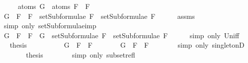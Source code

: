 \begin{isabellebody}
\ \ \ \ \ {\isachardoublequoteopen}atoms\ G\ {\isasymsubseteq}\ atoms\ {\isacharparenleft}F{}\ \isactrlbold {\isasymrightarrow}\ F{}{\isacharparenright}{\isachardoublequoteclose}\isanewline
%
\isadelimproof
%
\endisadelimproof
%
\isatagproof
{}\isamarkupfalse%
\ {\isacharminus}\isanewline
\ \ \isamarkupfalse%
\ {\isachardoublequoteopen}G\ {\isasymin}\ {\isacharbraceleft}F{}\ \isactrlbold {\isasymrightarrow}\ F{}{\isacharbraceright}\ {\isasymunion}\ {\isacharparenleft}setSubformulae\ F{}\ {\isasymunion}\ setSubformulae\ F{}{\isacharparenright}{\isachardoublequoteclose}\isanewline
\ \ \ \ \isamarkupfalse%
\ assms{\isacharparenleft}{}{\isacharparenright}\ \isanewline
\ \ \ \ \isamarkupfalse%
\ {\isacharparenleft}simp\ only{\isacharcolon}\ setSubformulae{\isacharunderscore}imp{\isacharparenright}\isanewline
\ \ \isamarkupfalse%
\ \isamarkupfalse%
\ {\isachardoublequoteopen}G\ {\isasymin}\ {\isacharbraceleft}F{}\ \isactrlbold {\isasymrightarrow}\ F{}{\isacharbraceright}\ {\isasymor}\ G\ {\isasymin}\ setSubformulae\ F{}\ {\isasymunion}\ setSubformulae\ F{}{\isachardoublequoteclose}\isanewline
\ \ \ \ \isamarkupfalse%
\ {\isacharparenleft}simp\ only{\isacharcolon}\ Un{\isacharunderscore}iff{\isacharparenright}\isanewline
\ \ \isamarkupfalse%
\ \isamarkupfalse%
\ {\isacharquery}thesis\isanewline
\ \ \isamarkupfalse%
\ \isanewline
\ \ \ \ \isamarkupfalse%
\ {\isachardoublequoteopen}G\ {\isasymin}\ {\isacharbraceleft}F{}\ \isactrlbold {\isasymrightarrow}\ F{}{\isacharbraceright}{\isachardoublequoteclose}\isanewline
\ \ \ \ \isamarkupfalse%
\ \isamarkupfalse%
\ {\isachardoublequoteopen}G\ {\isacharequal}\ F{}\ \isactrlbold {\isasymrightarrow}\ F{}{\isachardoublequoteclose}\isanewline
\ \ \ \ \ \ \isamarkupfalse%
\ {\isacharparenleft}simp\ only{\isacharcolon}\ singletonD{\isacharparenright}\isanewline
\ \ \ \ \isamarkupfalse%
\ \isamarkupfalse%
\ {\isacharquery}thesis\isanewline
\ \ \ \ \ \ \isamarkupfalse%
\ {\isacharparenleft}simp\ only{\isacharcolon}\ subset{\isacharunderscore}refl{\isacharparenright}\isanewline
\ \ \isamarkupfalse%
\isanewline
\ \ \ \ \isamarkupfalse%

\end{isabellebody}
